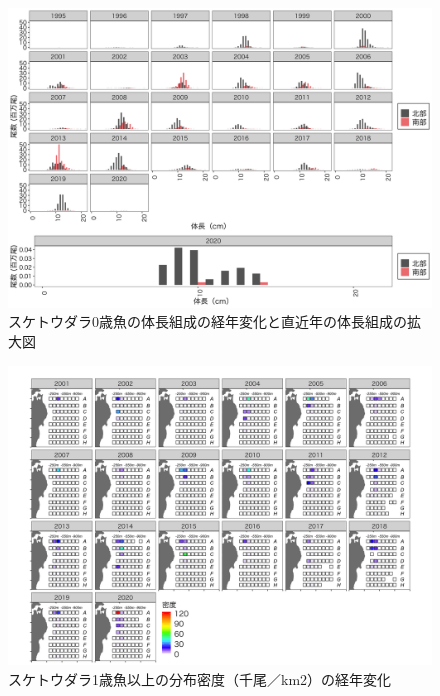 \documentclass[11pt]{article} %
\begin{document}
\begin{linenumbers}
\begin{figure}[h]
  \centering
  \includegraphics[width = 14cm]{スケトウダラ0+length.png}
  \caption{スケトウダラ0歳魚の体長組成の経年変化と直近年の体長組成の拡大図}
\end{figure}

\begin{figure}[h]
  \centering
  \includegraphics[width = 14cm]{スケトウダラ１＋dens.png}
  \caption{スケトウダラ1歳魚以上の分布密度（千尾／km2）の経年変化}
\end{figure}


\end{linenumbers}
\end{document}
